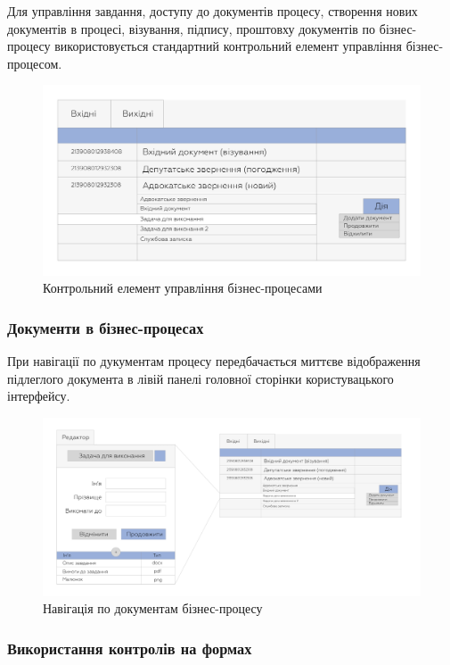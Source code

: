 Для управління завдання, доступу до документів процесу, створення нових документів в процесі,
візування, підпису, проштовху документів по бізнес-процесу використовується стандартний
контрольний елемент управління бізнес-процесом.

\begin{figure}[!htbp]
\centerline{\includegraphics[scale=0.3]{bpeControl.png}}
\caption{Контрольний елемент управління бізнес-процесами}
\end{figure}

\subsubsection{Документи в бізнес-процесах}

При навігації по дукументам процесу передбачається миттєве відображення підлеглого
документа в лівій панелі головної сторінки користувацького інтерфейсу.

\begin{figure}[!htbp]
\centerline{\includegraphics[scale=0.4]{searchBpe.png}}
\caption{Навігація по документам бізнес-процесу}
\end{figure}

\newpage
\subsubsection{Використання контролів на формах}


